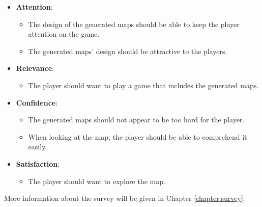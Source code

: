 \begin{itemize}
    \item \textbf{Attention}:
    \begin{itemize}
        \item The design of the generated maps should be able to keep the player attention on the game.
        \item The generated maps' design should be attractive to the players.
    \end{itemize}
    \item \textbf{Relevance}:
    \begin{itemize}
        \item The player should want to play a game that includes the generated maps.
    \end{itemize}
    \item \textbf{Confidence}: 
    \begin{itemize}
        \item The generated maps should not appear to be too hard for the player.
        \item When looking at the map, the player should be able to comprehend it easily.
    \end{itemize}
    \item \textbf{Satisfaction}:
    \begin{itemize}
        \item The player should want to explore the map.
    \end{itemize}
\end{itemize}

More information about the survey will be given in Chapter \ref{chapter:survey}.
